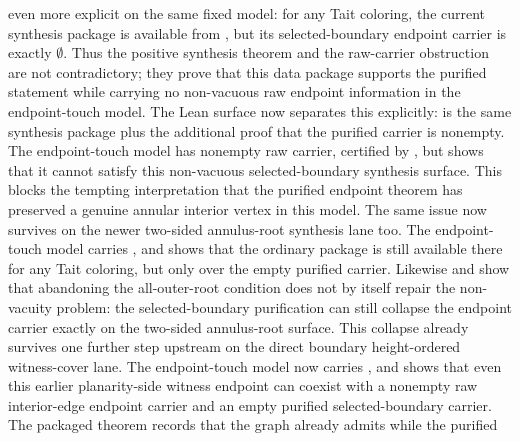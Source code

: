 \documentclass[11pt]{article}
\begin{document}
even more explicit on the same fixed model: for any Tait coloring, the current
synthesis package is available from
, but its
selected-boundary endpoint carrier is exactly \(\emptyset\).  Thus the
positive synthesis theorem and the raw-carrier obstruction are not
contradictory; they prove that this data package supports the purified
statement while carrying no non-vacuous raw endpoint information in the
endpoint-touch model.
The Lean surface now separates this explicitly:
 is the same synthesis
package plus the additional proof that the purified carrier is nonempty.  The
endpoint-touch model has nonempty raw carrier, certified by
, but
shows that it cannot satisfy this non-vacuous selected-boundary synthesis
surface.  This blocks the tempting interpretation that the purified endpoint
theorem has preserved a genuine annular interior vertex in this model.
The same issue now survives on the newer two-sided annulus-root synthesis lane
too.  The endpoint-touch model carries
, and
 shows that the
ordinary  package is still available there
for any Tait coloring, but only over the empty purified carrier.  Likewise
 and
show that abandoning the all-outer-root condition does not by itself repair the
non-vacuity problem: the selected-boundary purification can still collapse the
endpoint carrier exactly on the two-sided annulus-root surface.
This collapse already survives one further step upstream on the direct
boundary height-ordered witness-cover lane.  The endpoint-touch model now
carries
, and
shows that even this earlier planarity-side witness endpoint can coexist with a
nonempty raw interior-edge endpoint carrier and an empty purified
selected-boundary carrier.  The packaged theorem
records that the graph already admits
 while the purified
\end{document}
